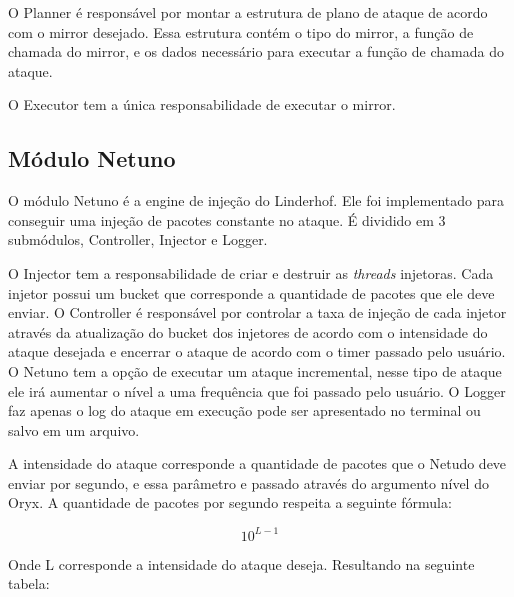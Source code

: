O Planner é responsável por montar a estrutura de plano de ataque de acordo com o mirror desejado. Essa estrutura contém o tipo do mirror, a função de chamada do mirror, e os dados necessário para executar a função de chamada do ataque.

O Executor tem a única responsabilidade de executar o mirror.

\subsection{Módulo Netuno}

O módulo Netuno é a engine de injeção do Linderhof. Ele foi implementado para conseguir uma injeção de pacotes constante no ataque. É dividido em 3 submódulos, Controller, Injector e Logger. 

O Injector tem a responsabilidade de criar e destruir as \textit{threads} injetoras. Cada injetor possui um bucket que corresponde a quantidade de pacotes que ele deve enviar.
O Controller é responsável por controlar a taxa de injeção de cada injetor através da atualização do bucket dos injetores de acordo com o intensidade do ataque desejada e encerrar o ataque de acordo com o timer passado pelo usuário. O Netuno tem a opção de executar um ataque incremental, nesse tipo de ataque ele irá aumentar o nível a uma frequência que foi passado pelo usuário. O Logger faz apenas o log do ataque em execução pode ser apresentado no terminal ou salvo em um arquivo.

A intensidade do ataque corresponde a quantidade de pacotes que o Netudo deve enviar por segundo, e essa parâmetro e passado através do argumento nível do Oryx. A quantidade de pacotes por segundo respeita a seguinte fórmula:

\begin{equation}
10^{L - 1}
\label{cal:Fator_Memcached2}
\end{equation}

Onde L corresponde a intensidade do ataque deseja. Resultando na seguinte tabela:

